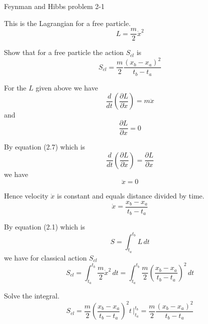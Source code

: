 \documentclass[12pt]{article}
\begin{document}
\begin{center}
Feynman and Hibbs problem 2-1
\end{center}

This is the Lagrangian for a free particle.
\begin{equation*}
L=\frac{m}{2}\dot x^2
\end{equation*}

Show that for a free particle the action $S_{cl}$ is
\begin{equation*}
S_{cl}=\frac{m}{2}\frac{(x_b-x_a)^2}{t_b-t_a}
\end{equation*}

For the $L$ given above we have
\begin{equation*}
\frac{d}{dt}\left(\frac{\partial L}{\partial\dot x}\right)=m\ddot x
\end{equation*}
and
\begin{equation*}
\frac{\partial L}{\partial x}=0
\end{equation*}

By equation (2.7) which is
\begin{equation*}
\frac{d}{dt}\left(\frac{\partial L}{\partial\dot x}\right)=\frac{\partial L}{\partial x}
\end{equation*}
we have
\begin{equation*}
\ddot x=0
\end{equation*}

Hence velocity $\dot x$ is constant and equals distance divided by time.
\begin{equation*}
\dot x=\frac{x_b-x_a}{t_b-t_a}
\end{equation*}

By equation (2.1) which is
\begin{equation*}
S=\int_{t_a}^{t_b} L\,dt
\end{equation*}
we have for classical action $S_{cl}$
\begin{equation*}
S_{cl}=\int_{t_a}^{t_b}\frac{m}{2}\dot x^2\,dt=\int_{t_a}^{t_b}\frac{m}{2}\left(\frac{x_b-x_a}{t_b-t_a}\right)^2\,dt
\end{equation*}

Solve the integral.
\begin{equation*}
S_{cl}
=\frac{m}{2}\left(\frac{x_b-x_a}{t_b-t_a}\right)^2 t\,\bigg|_{t_a}^{t_b}
=\frac{m}{2}\frac{(x_b-x_a)^2}{t_b-t_a}
\end{equation*}
\end{document}
